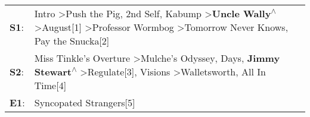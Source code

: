 \begin{supertabular}{p{0.03\textwidth}p{0.92\textwidth}}
 \textbf{S1}:  &  Intro\textsuperscript{} \textgreater \enspace Push the Pig\textsuperscript{}, \enspace 2nd Self\textsuperscript{}, \enspace Kabump\textsuperscript{} \textgreater \enspace \textbf{Uncle Wally\textsuperscript{$\wedge$}} \textgreater \enspace August[1]\textsuperscript{} \textgreater \enspace Professor Wormbog\textsuperscript{} \textgreater \enspace Tomorrow Never Knows\textsuperscript{}, \enspace Pay the Snucka[2]\textsuperscript{}  \enspace  \\
 \textbf{S2}:  &                                                          Miss Tinkle's Overture\textsuperscript{} \textgreater \enspace Mulche's Odyssey\textsuperscript{},  Days\textsuperscript{}, \enspace \textbf{Jimmy Stewart\textsuperscript{$\wedge$}} \textgreater \enspace Regulate[3]\textsuperscript{}, \enspace Visions\textsuperscript{} \textgreater \enspace Walletsworth\textsuperscript{}, \enspace All In Time[4]\textsuperscript{}  \enspace  \\
 \textbf{E1}:  &                                                                                                                                                                                                                                                                                                                                                                                                         Syncopated Strangers[5]\textsuperscript{}  \enspace  \\
\end{supertabular}
